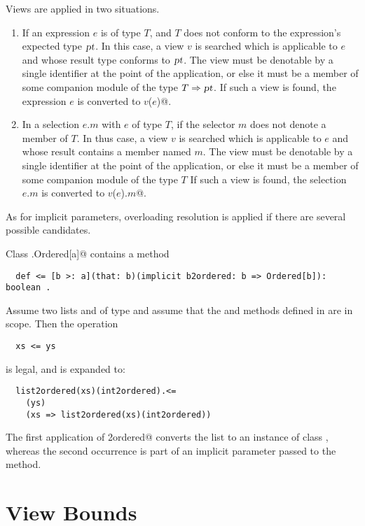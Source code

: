 Views are applied in two situations.
\begin{enumerate}
\item
If an expression $e$ is of type $T$, and $T$ does not conform to the expression's
expected type $\mbox{\sl pt}$.
In this case, a view $v$ is searched which is applicable to $e$
and whose result type conforms to $\mbox{\sl pt}$.  The view must be
denotable by a single identifier at the point of the application, or
else it must be a member of some companion module of the type $T \Rightarrow \mbox{\sl pt}$. 
If such a view is found, the expression $e$ is
converted to \lstinline@$v$($e$)@.
\item
In a selection $e.m$ with $e$ of type $T$, if the selector $m$ does not
denote a member of $T$.
In thus case, a view $v$ is searched which is applicable to $e$
and whose result contains a member named $m$.  The view must be
denotable by a single identifier at the point of the application, or
else it must be a member of some companion module of the type $T$
If such a view is found, the selection $e.m$ is
converted to \lstinline@$v$($e$).$m$@. 
\end{enumerate}
As for implicit parameters, overloading resolution is applied
if there are several possible candidates.

\example\label{ex:impl-ordered} Class \lstinline@scala.Ordered[a]@ contains a method
\begin{lstlisting}
  def <= [b >: a](that: b)(implicit b2ordered: b => Ordered[b]): boolean .
\end{lstlisting}
Assume two lists  and  of type 
and assume that the  and 
methods defined in  are in scope.
Then the operation
\begin{lstlisting}
  xs <= ys
\end{lstlisting}
is legal, and is expanded to:
\begin{lstlisting}
  list2ordered(xs)(int2ordered).<=
    (ys)
    (xs => list2ordered(xs)(int2ordered))
\end{lstlisting}
The first application of \lstinline@list2ordered@ converts the list
 to an instance of class , whereas the second 
occurrence is part of an implicit parameter passed to the \code{<=} method.

\section{View Bounds}\label{sec:view-bounds}

